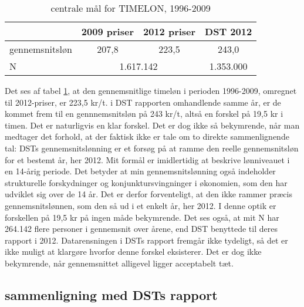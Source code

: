 \begin{table}[H] \centering
\caption{centrale mål for TIMELON, 1996-2009}
\label{app_timeloninf}
\begin{tabular}{@{}lccc@{}} \toprule								
	&	2009 priser	&	2012 priser	&	DST 2012	\\	\midrule
gennemsnitsløn	&	207,8	&	223,5	&	243,0	\\	
N	&	\multicolumn{2}{c}{1.617.142}			&	1.353.000	\\	\bottomrule
\end{tabular}
\end{table}





Det ses af tabel \ref{app_timeloninf}, at den gennemsnitlige timeløn i perioden 1996-2009, omregnet til 2012-priser, er 223,5 kr/t. i DST rapporten omhandlende samme år, er de kommet frem til en gennnemsnitsløn på 243 kr/t, altså en forskel på 19,5 kr i timen. Det er naturligvis en klar forskel. Det er dog ikke så bekymrende, når man medtager det forhold, at der faktisk ikke er tale om to direkte sammenlignende tal: DSTs gennemsnitslønning er et forsøg på at ramme den reelle gennemsnitsløn for et bestemt år, her 2012. Mit formål er imidlertidig at beskrive lønniveauet i en 14-årig periode. Det betyder at min gennemsnitslønning også indeholder strukturelle forskydninger og konjunktursvingninger i økonomien, som den har  udviklet sig over de 14 år. Det er derfor forventeligt, at den ikke rammer præcis gennemsnitslønnen, som den så ud i et enkelt år, her 2012. I denne optik er forskellen på 19,5 kr på ingen måde bekymrende. Det ses også, at mit N har 264.142 flere personer i gennemsnit over årene, end DST benyttede til deres rapport i 2012. Datarensningen i DSTs rapport fremgår ikke tydeligt, så det er ikke muligt at klargøre hvorfor denne forskel eksisterer. Det er dog ikke bekymrende, når gennemsnittet alligevel ligger acceptabelt tæt.  



\subsection{sammenligning med DSTs rapport \label{app_indkdstrapport}}


